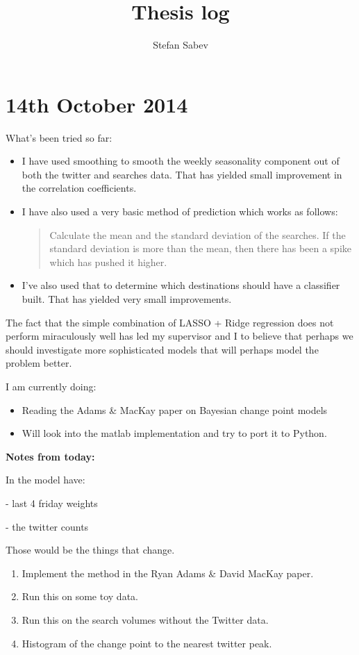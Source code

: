 \documentclass[11pt]{amsart}
\title{Thesis log}
\author{Stefan Sabev}
\begin{document}
\maketitle

\section{14th October 2014}

What's been tried so far:

\begin{itemize}
\item I have used smoothing to smooth the weekly seasonality component out of both the twitter and searches data.
That has yielded small improvement in the correlation coefficients.
\item I have also used a very basic method of prediction which works as follows:
\begin{quotation}
Calculate the mean and the standard deviation of the searches.
If the standard deviation is more than the mean, then there has been a spike which has pushed it higher.
\end{quotation}
\item I've also used that to determine which destinations should have a classifier built. That has yielded very small improvements.
\end{itemize}


The fact that the simple combination of LASSO + Ridge regression does not perform miraculously well has led my supervisor and I to believe that perhaps we should investigate more sophisticated models that will perhaps model the problem better.

I am currently doing:

\begin{itemize}
\item Reading the Adams \& MacKay paper on Bayesian change point models
\item Will look into the matlab implementation and try to port it to Python.
\end{itemize}


\textbf{Notes from today:}

In the model have:

- last 4 friday weights

- the twitter counts

Those would be the things that change.

\begin{enumerate}
\item Implement the method in the Ryan Adams \& David MacKay paper.
\item Run this on some toy data.
\item Run this on the search volumes without the Twitter data.
\item Histogram of the change point to the nearest twitter peak.
\end{enumerate}
\end{document}
